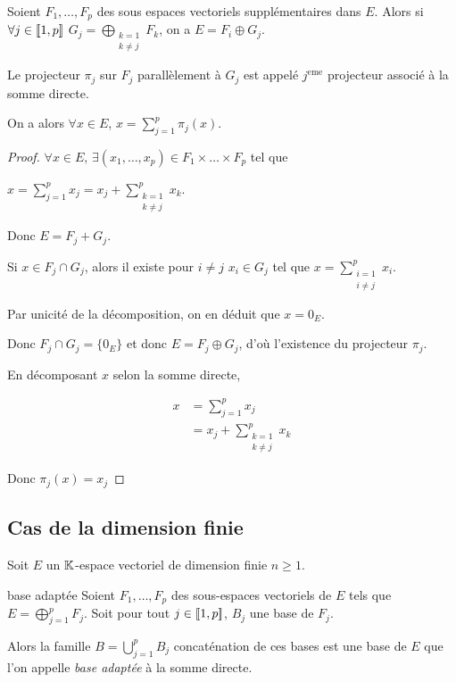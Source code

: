 \begin{theoreme}{}{}
    Soient $F_1, \dots, F_p$ des sous espaces vectoriels supplémentaires dans $E$.
    Alors si $\forall j \in [\![1, p]\!]$ $\displaystyle G_j = \bigoplus_{\substack{k = 1 \\ k \neq j}} F_k$,
    on a $E = F_i \oplus G_j$. 

    Le projecteur $\pi_j$ sur $F_j$ parallèlement à $G_j$ est appelé $j^{\text{eme}}$ projecteur associé à la somme directe. 

    On a alors $\forall x \in E$, $\displaystyle x = \sum_{j=1} ^p \pi_j(x)$.
\end{theoreme}

\begin{proof}
    $\forall x \in E, \, \exists (x_1, \dots, x_p) \in F_1 \times \dots \times F_p$ tel que

    $\displaystyle x = \sum_{j=1}^p x_j = x_j + \sum_{\substack{k=1 \\ k \neq j}}^p x_k$.

    Donc $E = F_j + G_j$.

    Si $x \in F_j \cap G_j$, alors il existe pour $i \neq j$ $x_i \in G_j$ tel que 
    $\displaystyle x = \sum_{\substack{i = 1 \\ i \neq j}}^{p } x_i$.

    Par unicité de la décomposition, on en déduit que $x = 0_E$.

    Donc $F_j \cap G_j = \{0_E\}$ et donc $E = F_j \oplus G_j$, d'où l'existence 
    du projecteur $\pi_j$.

    En décomposant $x$ selon la somme directe, 

    \begin{align}
        x & = \sum_{j=1}^p x_j \\
        & = x_j + \sum_{\substack{k=1 \\ k \neq j}}^p x_k 
    \end{align}

    Donc $\pi_j(x) = x_j$ 
\end{proof}

\subsection{Cas de la dimension finie }

Soit $E$ un $\mathbb{K}$-espace vectoriel de dimension finie $n \geqslant 1$. 

\begin{theoreme}{base adaptée}{}
    Soient $F_1, \dots, F_p$ des sous-espaces vectoriels de $E$ tels que $\displaystyle E = \bigoplus_{j=1}^p F_j$.
    Soit pour tout $j \in [\![1, p]\!]$, $B_j$ une base de $F_j$.

    Alors la famille $\displaystyle B = \bigcup_{j=1}^p B_j$ concaténation de ces bases est une base de $E$
    que l'on appelle \emph{base adaptée} à la somme directe.
\end{theoreme}

